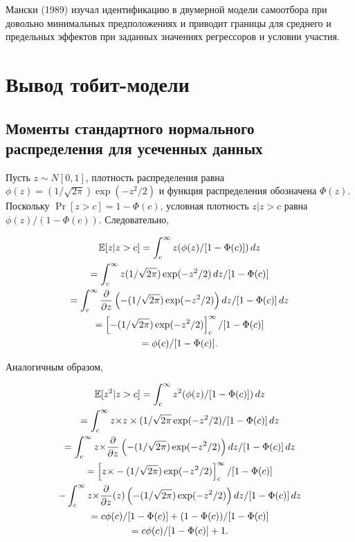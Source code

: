 Мански (1989) изучал идентификацию в двумерной модели самоотбора при довольно минимальных предположениях и приводит границы для среднего и предельных эффектов при заданных значениях регрессоров и условии участия.



\section{Вывод тобит-модели}

\subsection{Моменты стандартного нормального распределения для усеченных данных}

Пусть $z \sim N[0,1]$, плотность распределения равна $\phi(z)=(1/\sqrt{2\pi})\exp (-z^2/2)$ и функция распределения обозначена $\Phi(z)$. Поскольку $\Pr[ z>c]=1-\Phi(c)$, условная плотность $z|z>c$ равна $\phi(z)/(1-\Phi(c))$. Следовательно,


\begin{multline}
\mathbb{E}[z|z>c]=\int_c^{\infty}z(\phi(z)/[1-\Phi(c)])\,dz\\
=\int_c^{\infty} z (1/\sqrt{2\pi})\exp (-z^2/2) \,dz /[1-\Phi(c)]\\
=\int_c^{\infty}
\dfrac{\partial}{\partial{z}}
\left(-(1/\sqrt{2\pi})\exp (-z^2/2)\right)
dz/
[1-\Phi(c)]\,dz\\
=\left[ -(1/\sqrt{2\pi})\exp (-z^2/2) \right]_c^{\infty}/ [1-\Phi(c)]\\
=\phi(c)/[1-\Phi(c)].
\end{multline}

Аналогичным образом, 

\begin{multline}
\mathbb{E}[z^2|z>c]=\int_c^{\infty}z^2(\phi(z)/[1-\Phi(c)])\,dz \\
=\int_c^{\infty} z{\times}z \times (1/\sqrt{2\pi}\exp (-z^2/2)/[1-\Phi(c)]\,dz \\
=\int_c^{\infty}z{\times}\dfrac{\partial}{\partial{z}}\left(-(1/\sqrt{2\pi})\exp (-z^2/2)\right)dz/[1-\Phi(c)]\,dz \\
=\left[z{\times}-(1/\sqrt{2\pi})\exp (-z^2/2)\right]_c^{\infty}/[1-\Phi(c)] \\
-\int_c^{\infty}z{\times}\dfrac{\partial}{\partial{z}}(z)\left(-(1/\sqrt{2\pi})\exp (-z^2/2)\right)dz/[1-\Phi(c)]\,dz\\
=c\phi(c)/[1-\Phi(c)]+(1-\Phi(c))/[1-\Phi(c)] \\
=c\phi(c)/[1-\Phi(c)]+1.
\end{multline}

